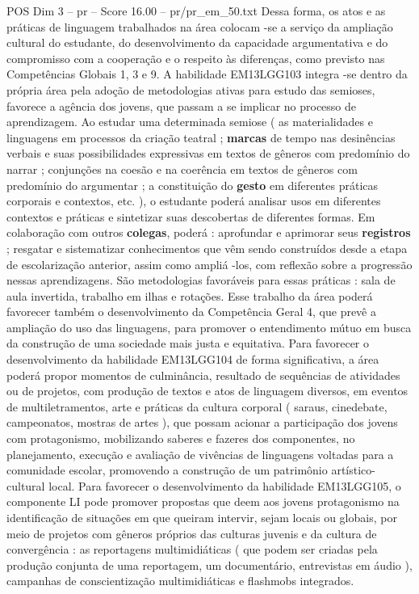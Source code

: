 \begin{textsample}{POS Dim 3 – pr – Score 16.00 – pr/pr\_em\_50.txt}
Dessa forma, os atos e as práticas de linguagem trabalhados na área colocam -se a serviço da ampliação cultural do estudante, do desenvolvimento da capacidade argumentativa e do compromisso com a cooperação e o respeito às diferenças, como previsto nas Competências Globais 1, 3 e 9.
A habilidade EM13LGG103 integra -se dentro da própria área pela adoção de metodologias ativas para estudo das semioses, favorece a agência dos jovens, que passam a se implicar no processo de aprendizagem.
Ao estudar uma determinada semiose ( as materialidades e linguagens em processos da criação teatral ; \textbf{marcas} de tempo nas desinências verbais e suas possibilidades expressivas em textos de gêneros com predomínio do narrar ; conjunções na coesão e na coerência em textos de gêneros com predomínio do argumentar ; a constituição do \textbf{gesto} em diferentes práticas corporais e contextos, etc. ), o estudante poderá analisar usos em diferentes contextos e práticas e sintetizar suas descobertas de diferentes formas.
Em colaboração com outros \textbf{colegas}, poderá : aprofundar e aprimorar seus \textbf{registros} ; resgatar e sistematizar conhecimentos que vêm sendo construídos desde a etapa de escolarização anterior, assim como ampliá -los, com reflexão sobre a progressão nessas aprendizagens.
São metodologias favoráveis para essas práticas : sala de aula invertida, trabalho em ilhas e rotações.
Esse trabalho da área poderá favorecer também o desenvolvimento da Competência Geral 4, que prevê a ampliação do uso das linguagens, para promover o entendimento mútuo em busca da construção de uma sociedade mais justa e equitativa.
Para favorecer o desenvolvimento da habilidade EM13LGG104 de forma significativa, a área poderá propor momentos de culminância, resultado de sequências de atividades ou de projetos, com produção de textos e atos de linguagem diversos, em eventos de multiletramentos, arte e práticas da cultura corporal ( saraus, cinedebate, campeonatos, mostras de artes ), que possam acionar a participação dos jovens com protagonismo, mobilizando saberes e fazeres dos componentes, no planejamento, execução e avaliação de vivências de linguagens voltadas para a comunidade escolar, promovendo a construção de um patrimônio artístico-cultural local.
Para favorecer o desenvolvimento da habilidade EM13LGG105, o componente LI pode promover propostas que deem aos jovens protagonismo na identificação de situações em que queiram intervir, sejam locais ou globais, por meio de projetos com gêneros próprios das culturas juvenis e da cultura de convergência : as reportagens multimidiáticas ( que podem ser criadas pela produção conjunta de uma reportagem, um documentário, entrevistas em áudio ), campanhas de conscientização multimidiáticas e flashmobs integrados.

\end{textsample}
